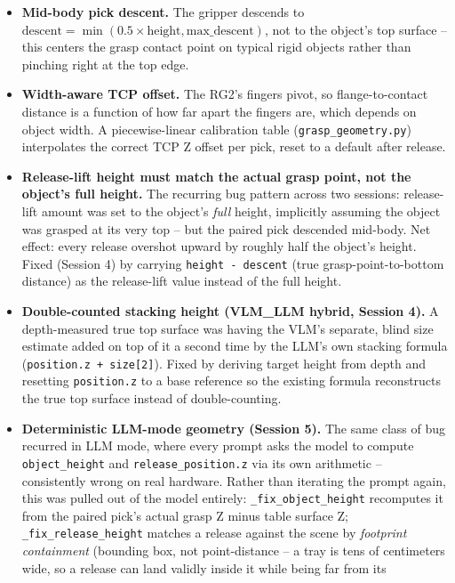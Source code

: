 \begin{itemize}[nosep]
  \item \textbf{Mid-body pick descent.} The gripper descends to
    $\text{descent} = \min(0.5 \times \text{height}, \text{max\_descent})$,
    not to the object's top surface -- this centers the grasp contact point
    on typical rigid objects rather than pinching right at the top edge.
  \item \textbf{Width-aware TCP offset.} The RG2's fingers pivot, so
    flange-to-contact distance is a function of how far apart the fingers
    are, which depends on object width. A piecewise-linear calibration table
    (\texttt{grasp\_geometry.py}) interpolates the correct TCP Z offset per
    pick, reset to a default after release.
  \item \textbf{Release-lift height must match the actual grasp point, not
    the object's full height.} The recurring bug pattern across two
    sessions: release-lift amount was set to the object's \emph{full}
    height, implicitly assuming the object was grasped at its very top --
    but the paired pick descended mid-body. Net effect: every release
    overshot upward by roughly half the object's height. Fixed (Session 4)
    by carrying \texttt{height - descent} (true grasp-point-to-bottom
    distance) as the release-lift value instead of the full height.
  \item \textbf{Double-counted stacking height (VLM\_LLM hybrid, Session 4).}
    A depth-measured true top surface was having the VLM's separate, blind
    size estimate added on top of it a second time by the LLM's own
    stacking formula (\texttt{position.z + size[2]}). Fixed by deriving
    target height from depth and resetting \texttt{position.z} to a base
    reference so the existing formula reconstructs the true top surface
    instead of double-counting.
  \item \textbf{Deterministic LLM-mode geometry (Session 5).} The same class
    of bug recurred in LLM mode, where every prompt asks the model to
    compute \texttt{object\_height} and \texttt{release\_position.z} via its
    own arithmetic -- consistently wrong on real hardware. Rather than
    iterating the prompt again, this was pulled out of the model entirely:
    \texttt{\_fix\_object\_height} recomputes it from the paired pick's
    actual grasp Z minus table surface Z; \texttt{\_fix\_release\_height}
    matches a release against the scene by \emph{footprint containment}
    (bounding box, not point-distance -- a tray is tens of centimeters wide,
    so a release can land validly inside it while being far from its

\end{itemize}
